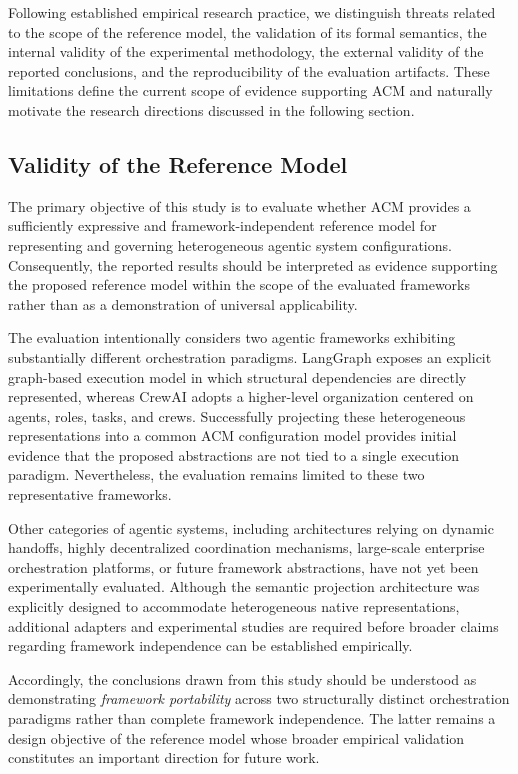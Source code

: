 \documentclass[10pt]{article}
\begin{document}
Following established empirical research practice, we distinguish threats related to the scope of the reference model, the validation of its formal semantics, the internal validity of the experimental methodology, the external validity of the reported conclusions, and the reproducibility of the evaluation artifacts. These limitations define the current scope of evidence supporting ACM and naturally motivate the research directions discussed in the following section.

\subsection{Validity of the Reference Model}
\label{sec:validity_reference_model}

The primary objective of this study is to evaluate whether ACM provides a sufficiently expressive and framework-independent reference model for representing and governing heterogeneous agentic system configurations. Consequently, the reported results should be interpreted as evidence supporting the proposed reference model within the scope of the evaluated frameworks rather than as a demonstration of universal applicability.

The evaluation intentionally considers two agentic frameworks exhibiting substantially different orchestration paradigms. LangGraph exposes an explicit graph-based execution model in which structural dependencies are directly represented, whereas CrewAI adopts a higher-level organization centered on agents, roles, tasks, and crews. Successfully projecting these heterogeneous representations into a common ACM configuration model provides initial evidence that the proposed abstractions are not tied to a single execution paradigm. Nevertheless, the evaluation remains limited to these two representative frameworks.

Other categories of agentic systems, including architectures relying on dynamic handoffs, highly decentralized coordination mechanisms, large-scale enterprise orchestration platforms, or future framework abstractions, have not yet been experimentally evaluated. Although the semantic projection architecture was explicitly designed to accommodate heterogeneous native representations, additional adapters and experimental studies are required before broader claims regarding framework independence can be established empirically.

Accordingly, the conclusions drawn from this study should be understood as demonstrating \emph{framework portability} across two structurally distinct orchestration paradigms rather than complete framework independence. The latter remains a design objective of the reference model whose broader empirical validation constitutes an important direction for future work.
\end{document}
